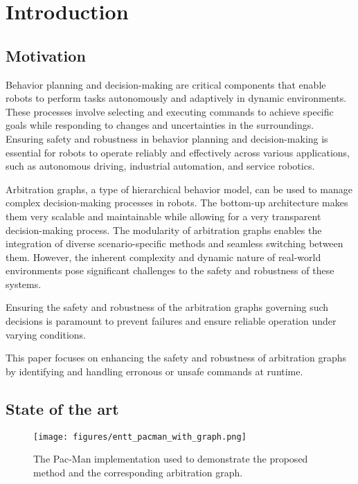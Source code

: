 \section{Introduction}

\subsection{Motivation}

Behavior planning and decision-making are critical components that enable robots to perform tasks autonomously and adaptively in dynamic environments.
These processes involve selecting and executing commands to achieve specific goals while responding to changes and uncertainties in the surroundings.
Ensuring safety and robustness in behavior planning and decision-making is essential for robots to operate reliably and effectively across various applications, such as autonomous driving, industrial automation, and service robotics.

Arbitration graphs, a type of hierarchical behavior model, can be used to manage complex decision-making processes in robots.
The bottom-up architecture makes them very scalable and maintainable while allowing for a very transparent decision-making process.
The modularity of arbitration graphs enables the integration of diverse scenario-specific methods and seamless switching between them.
However, the inherent complexity and dynamic nature of real-world environments pose significant challenges to the safety and robustness of these systems.

Ensuring the safety and robustness of the arbitration graphs governing such decisions is paramount to prevent failures and ensure reliable operation under varying conditions.

This paper focuses on enhancing the safety and robustness of arbitration graphs by identifying and handling erronous or unsafe commands at runtime.

\subsection{State of the art}

\begin{figure}
    \centering
    \texttt{[image: figures/entt\_pacman\_with\_graph.png]}
    \caption{The Pac-Man implementation used to demonstrate the proposed method and the corresponding arbitration graph.}
    \label{fig:entt-pacman}
\end{figure}
